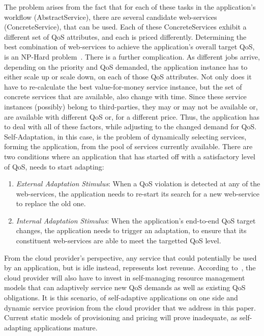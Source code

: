 \documentclass[10pt,journal,compsoc]{IEEEtran}
\begin{document}
The problem arises from the fact that for each of these tasks in the application's workflow (AbstractService), there are several candidate web-services (ConcreteService), that can be used. Each of these ConcreteServices exhibit a different set of QoS attributes, and each is priced differently. Determining the best combination of web-services to achieve the application's overall target QoS, is an NP-Hard problem~\cite{Ardagna2005Global}. There is a further complication. As different jobs arrive, depending on the priority and QoS demanded, the application instance has to either scale up or scale down, on each of those QoS attributes. Not only does it have to re-calculate the best value-for-money service instance, but the set of concrete services that are available, also change with time. Since these service instances (possibly) belong to third-parties, they may or may not be available or, are available with different QoS or, for a different price. Thus, the application has to deal with all of these factors, while adjusting to the changed demand for QoS.  Self-Adaptation, in this case, is the problem of dynamically selecting services, forming the application, from the pool of services currently available. There are two conditions where an application that has started off with a satisfactory level of QoS, needs to start adapting:
	\begin{enumerate}
	    \item \textit{External Adaptation Stimulus}: When a QoS violation is detected at any of the web-services, the application needs to re-start its search for a new web-service to replace the old one.
	     \item \textit{Internal Adaptation Stimulus}: When the application's end-to-end QoS target changes, the application needs to trigger an adaptation, to ensure that its constituent web-services are able to meet the targetted QoS level.
	\end{enumerate} 
From the cloud provider's perspective, any service that could potentially be used by an application, but is idle instead, represents lost revenue. According to~\cite{Buyya2008Market-Oriented}, the cloud provider will also have to invest in self-managing resource management models that can adaptively service new QoS demands as well as existing QoS obligations. It is this scenario, of self-adaptive applications on one side and dynamic service provision from the cloud provider that we address in this paper. Current static models of provisioning and pricing will prove inadequate, as self-adapting applications mature.
  
\end{document}
